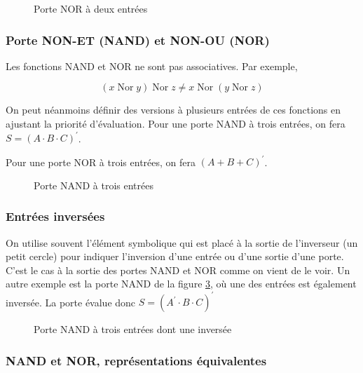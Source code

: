 \documentclass[11pt]{article}
\begin{document}
\begin{figure}[htbp]
\centering

\caption{\label{fig:orgb9eb12e}Porte NOR à deux entrées}
\end{figure}

\subsubsection{Porte NON-ET (NAND) et NON-OU (NOR)}
\label{sec:orgc11a5df}

Les fonctions NAND et NOR ne sont pas associatives. Par exemple,

$$
(x \operatorname{Nor} y) \operatorname{Nor} z \neq x \operatorname{Nor} (y \operatorname{Nor} z) 
$$

On peut néanmoins définir des versions à plusieurs entrées de ces
fonctions en ajustant la priorité d'évaluation. Pour une porte NAND à
trois entrées, on fera \(S = (A \cdot B \cdot C)^\prime\).

Pour une porte NOR à trois entrées, on fera \((A + B + C)^\prime\).

\begin{figure}[htbp]
\centering

\caption{\label{fig:orgfc321ca}Porte NAND à trois entrées}
\end{figure}

\subsubsection{Entrées inversées}
\label{sec:org6d35eaa}

On utilise souvent l'élément symbolique qui est placé à la sortie de
l'inverseur (un petit cercle) pour indiquer l'inversion d'une entrée
ou d'une sortie d'une porte. C'est le cas à la sortie des portes NAND
et NOR comme on vient de le voir. Un autre exemple est la porte NAND
de la figure \ref{fig:org32fafcc}, où une des entrées est également
inversée. La porte évalue donc \(S =  (A^\prime \cdot B  \cdot C)^\prime\)

\begin{figure}[htbp]
\centering

\caption{\label{fig:org32fafcc}Porte NAND à trois entrées dont une inversée}
\end{figure} 

\subsubsection{NAND et NOR, représentations équivalentes}
\label{sec:org8c2abb1}
\end{document}
